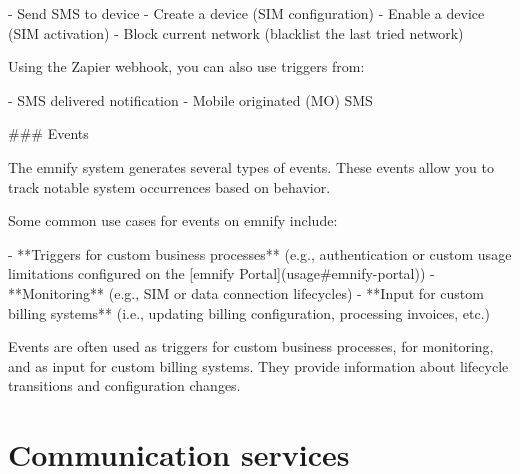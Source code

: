 \documentclass[11pt, oneside]{article}   	%
\newcommand{\addspace}{\vspace{2mm}}
\begin{document}
\addspace
\begin{markdown}
- Send SMS to device
- Create a device (SIM configuration)
- Enable a device (SIM activation)
- Block current network (blacklist the last tried network)
\end{markdown}
\addspace
\begin{markdown}

Using the Zapier webhook, you can also use triggers from:

\end{markdown}
\addspace
\begin{markdown}
- SMS delivered notification
- Mobile originated (MO) SMS
\end{markdown}
\addspace
\begin{markdown}

### Events

The emnify system generates several types of events.
These events allow you to track notable system occurrences based on behavior.

Some common use cases for events on emnify include:

\end{markdown}
\addspace
\begin{markdown}
- **Triggers for custom business processes** (e.g., authentication or custom usage limitations configured on the [emnify Portal](usage#emnify-portal))
- **Monitoring** (e.g., SIM or data connection lifecycles)
- **Input for custom billing systems** (i.e., updating billing configuration, processing invoices, etc.)
\end{markdown}
\addspace
\begin{markdown}

Events are often used as triggers for custom business processes, for monitoring, and as input for custom billing systems.
They provide information about lifecycle transitions and configuration changes.

\end{markdown}
\pagebreak[4]
\section{Communication services}
\end{document}
